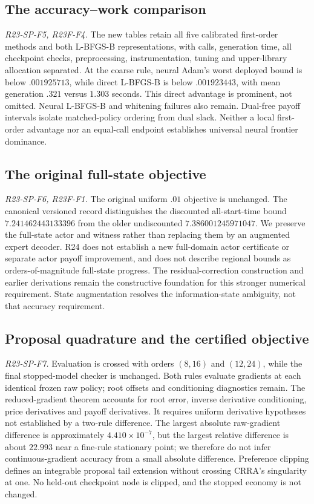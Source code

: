\subsection{The accuracy--work comparison}
\noindent\textit{R23-SP-F5, R23F-F4.}
The new tables retain all five calibrated first-order methods and both L-BFGS-B representations, with calls, generation time, all checkpoint checks, preprocessing, instrumentation, tuning and upper-library allocation separated. At the coarse rule, neural Adam's worst deployed bound is below $.001925713$, while direct L-BFGS-B is below $.001923443$, with mean generation $.321$ versus $1.303$ seconds. This direct advantage is prominent, not omitted. Neural L-BFGS-B and whitening failures also remain. Dual-free payoff intervals isolate matched-policy ordering from dual slack. Neither a local first-order advantage nor an equal-call endpoint establishes universal neural frontier dominance.

\subsection{The original full-state objective}
\noindent\textit{R23-SP-F6, R23F-F1.}
The original uniform $.01$ objective is unchanged. The canonical versioned record distinguishes the discounted all-start-time bound $7.241462443133396$ from the older undiscounted $7.386001245971047$. We preserve the full-state actor and witness rather than replacing them by an augmented expert decoder. R24 does not establish a new full-domain actor certificate or separate actor payoff improvement, and does not describe regional bounds as orders-of-magnitude full-state progress. The residual-correction construction and earlier derivations remain the constructive foundation for this stronger numerical requirement. State augmentation resolves the information-state ambiguity, not that accuracy requirement.

\subsection{Proposal quadrature and the certified objective}
\noindent\textit{R23-SP-F7.}
Evaluation is crossed with orders $(8,16)$ and $(12,24)$, while the final stopped-model checker is unchanged. Both rules evaluate gradients at each identical frozen raw policy; root offsets and conditioning diagnostics remain. The reduced-gradient theorem accounts for root error, inverse derivative conditioning, price derivatives and payoff derivatives. It requires uniform derivative hypotheses not established by a two-rule difference. The largest absolute raw-gradient difference is approximately $4.410\times10^{-7}$, but the largest relative difference is about $22.993$ near a fine-rule stationary point; we therefore do not infer continuous-gradient accuracy from a small absolute difference. Preference clipping defines an integrable proposal tail extension without crossing CRRA's singularity at one. No held-out checkpoint node is clipped, and the stopped economy is not changed.

